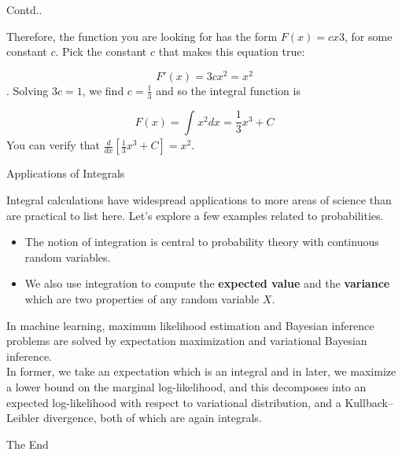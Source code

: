 \documentclass{beamer}
\begin{document}
\begin{frame}{Contd..}
\begin{flushleft}
Therefore, the function you are looking for has the form $F(x)=cx3$, for some constant $c$. Pick the constant $c$ that makes this equation true:

$$F'(x)=3cx^2=x^2$$.
Solving $3c=1$, we find $c=\frac{1}{3}$ and so the integral function is

$$F(x)=\int_{}{}x^2dx = \frac{1}{3}x^3+C$$
You can verify that $\frac{d}{dx}[\frac{1}{3}x^3+C]=x^2$.
	\end{flushleft}
\vspace{5pt}
\end{frame}

\begin{frame}{Applications of Integrals}
	\begin{flushleft}
		Integral calculations have widespread applications to more areas of science than are practical to list here. Let’s explore a few examples related to probabilities. \\
		\begin{itemize}
			\item The notion of integration is central to probability theory with continuous random variables.
			\item We also use integration to compute the \textbf{expected value} and the \textbf{variance} which are two properties of any random variable $X$.
		\end{itemize}	
\vspace{5pt}
		In machine learning, maximum likelihood estimation and Bayesian inference problems are solved by expectation maximization and variational Bayesian inference. \\ 
\vspace{5pt}
In former, we take an expectation which is an integral and in later, we maximize a lower bound on the marginal log-likelihood, and this decomposes into an expected log-likelihood with respect to variational distribution, and a Kullback–Leibler divergence, both of which are again integrals.
	\end{flushleft}
\end{frame}
	
\begin{frame}
\huge{\centerline{The End}}
\end{frame}
\end{document}
